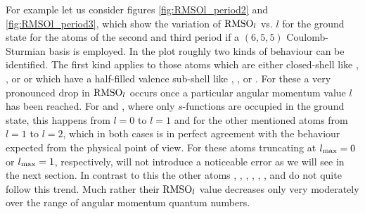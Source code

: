 For example let us consider figures \ref{fig:RMSOl_period2}
and \vref{fig:RMSOl_period3},
which show the variation of $\text{RMSO}_l$ vs. $l$ for the \HF ground state
for the atoms of the second and third period
if a $(6,5,5)$ Coulomb-Sturmian basis is employed.
In the plot roughly two kinds of behaviour can be identified.
The first kind applies to those atoms which are either closed-shell
like , ,  or 
or which have a half-filled valence sub-shell
like , ,  or .
For these a very pronounced drop in $\text{RMSO}_l$ occurs once a particular
angular momentum value $l$ has been reached.
For  and , where only $s$-functions are occupied in the ground state,
this happens from $l=0$ to $l=1$
and for the other mentioned atoms from $l=1$ to $l=2$,
which in both cases is in perfect agreement with the behaviour expected
from the physical point of view.
For these atoms truncating at $l_\text{max} = 0$ or $l_\text{max}=1$, respectively,
will not introduce a noticeable error as we will see in the next section.
In contrast to this the other atoms
, , , , , ,  and 
do not quite follow this trend.
Much rather their $\text{RMSO}_l$ value decreases only very moderately over the range
of angular momentum quantum numbers.

